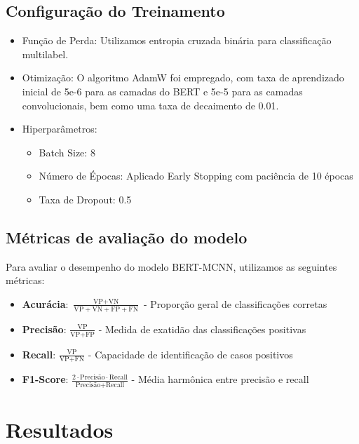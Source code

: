 \documentclass[sigconf,nonacm]{acmart}
\begin{document}
\subsection{Configuração do Treinamento}
\begin{itemize}
  \item Função de Perda: Utilizamos entropia cruzada binária para classificação multilabel.
  \item Otimização: O algoritmo AdamW foi empregado, com taxa de aprendizado inicial de 5e-6 para as camadas do BERT e 5e-5 para as camadas convolucionais, bem como uma taxa de decaimento de 0.01.
  \item Hiperparâmetros:
  \begin{itemize}
    \item Batch Size: 8
    \item Número de Épocas: Aplicado Early Stopping com paciência de 10 épocas
    \item Taxa de Dropout: 0.5
  \end{itemize}
\end{itemize}

\subsection{Métricas de avaliação do modelo}
Para avaliar o desempenho do modelo BERT-MCNN, utilizamos as seguintes métricas:

\begin{itemize}
  \item \textbf{Acurácia}: $\frac{\text{VP} + \text{VN}}{\text{VP} + \text{VN} + \text{FP} + \text{FN}}$ - Proporção geral de classificações corretas

  \item \textbf{Precisão}: $\frac{\text{VP}}{\text{VP} + \text{FP}}$ - Medida de exatidão das classificações positivas
    
  \item \textbf{Recall}: $\frac{\text{VP}}{\text{VP} + \text{FN}}$ - Capacidade de identificação de casos positivos
  
  \item \textbf{F1-Score}: $\frac{2 \cdot \text{Precisão} \cdot \text{Recall}}{\text{Precisão} + \text{Recall}}$ - Média harmônica entre precisão e recall

\end{itemize}

\section{Resultados}
\end{document}
